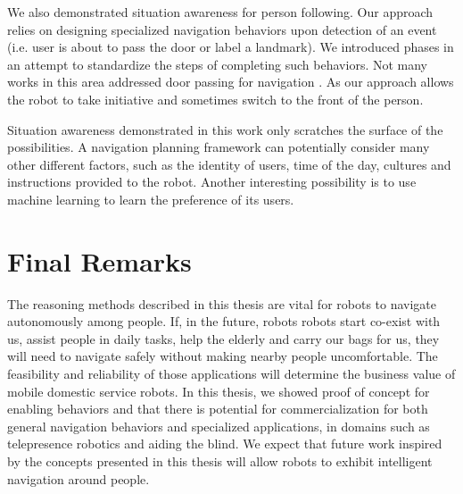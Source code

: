 \documentclass[12pt]{gatech-thesis}
\begin{document}
We also demonstrated situation awareness for person following. Our approach relies on designing specialized navigation behaviors upon detection of an event (i.e. user is about to pass the door or label a landmark). We introduced phases in an attempt to standardize the steps of completing such behaviors. Not many works in this area addressed door passing for navigation \cite{zender2007integrated}. As our approach allows the robot to take initiative and sometimes switch to the front of the person.

Situation awareness demonstrated in this work only scratches the surface of the possibilities. A navigation planning framework can potentially consider many other different factors, such as the identity of users, time of the day, cultures and instructions provided to the robot. Another interesting possibility is to use machine learning to learn the preference of its users.


\section{Final Remarks}

The reasoning methods described in this thesis are vital for robots to navigate autonomously among people. If, in the future, robots robots start co-exist with us, assist people in daily tasks, help the elderly and carry our bags for us, they will need to navigate safely without making nearby people uncomfortable. The feasibility and reliability of those applications will determine the business value of mobile domestic service robots. In this thesis, we showed proof of concept for enabling behaviors and that there is potential for commercialization for both general navigation behaviors and specialized applications, in domains such as telepresence robotics and aiding the blind. We expect that future work inspired by the concepts presented in this thesis will allow robots to exhibit intelligent navigation around people.




%
%
\end{document}
